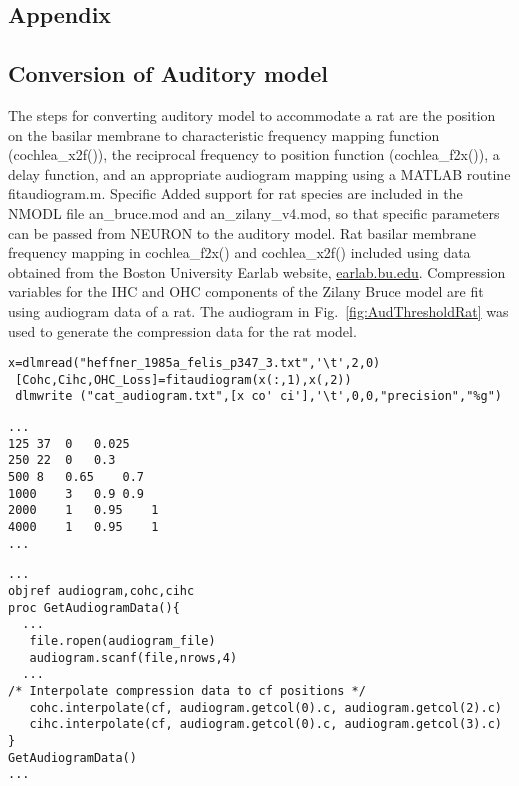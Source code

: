 \graphicspath{{/media/data/Work/cnstellate/golgi/}{/media/data/Work/cnstellate/Responses/}{../figures/}{./gfx/}}

\begin{appendix}
\section{Appendix}
\label{sec:chp3appendix}
\subsection{Conversion of Auditory model}


The steps for converting \citet{ZilanyBruce:2007} auditory model to
accommodate a rat are the position on the basilar membrane to
characteristic frequency mapping function (\mbox{\textsf{cochlea\_x2f()}}), the
reciprocal frequency to position function (\mbox{\textsf{cochlea\_f2x()}}), a
delay function, and an appropriate audiogram mapping using a MATLAB
routine \mbox{\textsf{fitaudiogram.m}}.  Specific Added support for rat species
are included in the NMODL file \mbox{\textsf{an\_bruce.mod}} and \mbox{\textsf{an\_zilany\_v4.mod}}, so that specific
parameters can be passed from NEURON to the auditory model.  Rat
basilar membrane frequency mapping in \mbox{\textsf{cochlea\_f2x()}} and
\mbox{\textsf{cochlea\_x2f()}} included using data obtained from the Boston University Earlab
website, \url{earlab.bu.edu}.  Compression variables for the IHC and OHC
components of the Zilany Bruce model are fit using audiogram data of a
rat.  The audiogram in Fig.~\ref{fig:AudThresholdRat} was used to
generate the compression data for the rat model.

\medskip{}

\begin{lstlisting}[label=lst:makeaudiogram,caption=Using fitaudiogram.m to create COHC and CIHC vectors for the cat.]
 x=dlmread("heffner_1985a_felis_p347_3.txt",'\t',2,0)
 [Cohc,Cihc,OHC_Loss]=fitaudiogram(x(:,1),x(,2))
 dlmwrite ("cat_audiogram.txt",[x co' ci'],'\t',0,0,"precision","%g")
\end{lstlisting}


\begin{lstlisting}[label=lst:cataudiogram,caption=Portion of cat\_audiogram.txt]
...
125	37	0	0.025
250	22	0	0.3
500	8	0.65	0.7
1000	3	0.9	0.9
2000	1	0.95	1
4000	1	0.95	1
...
\end{lstlisting}


\begin{lstlisting}[label=lst:getaudiogramdata,caption= Procedure to get audiogram data and interpolate to freuencies in \textsf{cf} vector (Utilities.hoc)]
...
objref audiogram,cohc,cihc
proc GetAudiogramData(){
  ...
   file.ropen(audiogram_file)
   audiogram.scanf(file,nrows,4)
  ...
/* Interpolate compression data to cf positions */
   cohc.interpolate(cf, audiogram.getcol(0).c, audiogram.getcol(2).c)
   cihc.interpolate(cf, audiogram.getcol(0).c, audiogram.getcol(3).c)
}
GetAudiogramData() 
...
\end{lstlisting}


\end{appendix}
